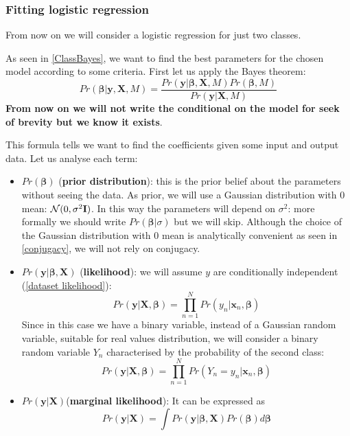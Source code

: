\documentclass[12pt, letterpaper]{article}
\theoremstyle{definition}
\newcommand{\X}{\mathrm{\mathbf{X}}}
\newcommand{\I}{\mathrm{\mathbf{I}}}
\newcommand{\y}{\mathbf{y}}
\newcommand{\be}{\mathbf{\beta}}
\newcommand{\x}{\mathbf{x}}
\begin{document}
\subsubsection{Fitting logistic regression}
From now on we will consider a logistic regression for just two classes. 

As seen in \ref{ClassBayes}, we want to find the best parameters for the chosen model according to some criteria. First let us apply the Bayes theorem:
\begin{equation}
Pr\left(\be|\y,\X,M\right) = \frac{Pr\left(\y|\be,\X,M\right) Pr(\be,M)}{Pr(\y|\X,M)}
\end{equation}
\textbf{From now on we will not write the conditional on the model for seek of brevity but we know it exists}.

This formula tells we want to find the coefficients given some input and output data. Let us analyse each term:
\begin{itemize}
\item $Pr(\be)$ (\textbf{prior distribution}): this is the prior belief about the parameters without seeing the data. As prior, we will use a Gaussian distribution with $0$ mean:  $\CMcal{N}(0, \sigma^2\I)$. In this way the parameters will depend on $\sigma^2$: more formally we should write $Pr(\be|\sigma)$ but we will skip. Although the choice of the Gaussian distribution with $0$ mean is analytically convenient as seen in \ref{conjugacy}, we will not rely on conjugacy.
\item $Pr\left(\y|\be,\X\right)$ (\textbf{likelihood}): we will assume $y$ are conditionally independent (\ref{dataset likelihood}):
\begin{equation}
Pr(\y|\X, \be) = \prod_{n=1}^N Pr(y_n|\x_n, \be)
\end{equation}
Since in this case we have a binary variable, instead of a Gaussian random variable, suitable for real values distribution, we will consider a binary random variable $Y_n$ characterised by the probability of the second class:
\begin{equation}
Pr(\y|\X, \be) = \prod_{n=1}^N Pr(Y_n=y_n|\x_n, \be)
\end{equation}
\item $Pr(\y|\X)$(\textbf{marginal likelihood}): It can be expressed as 
\begin{equation}
Pr(\y|\X) = \int Pr\left(\y|\be,\X\right) Pr(\be) d\be
\end{equation}
\end{itemize}
\end{document}
